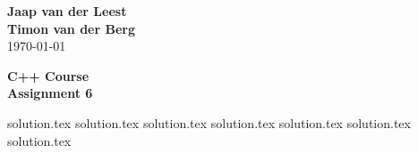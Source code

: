 \documentclass{article}[9pt]
\begin{document}
\begin{flushright}
	\textbf{Jaap van der Leest\\ Timon van der Berg \\ }
\today
\end{flushright}

\begin{center}
\textbf{C++ Course \\
Assignment 6} \\
\end{center}


    {solution.tex}
    {solution.tex}
    {solution.tex}
    {solution.tex}
    {solution.tex}
    {solution.tex}
    {solution.tex}
 
\end{document}
